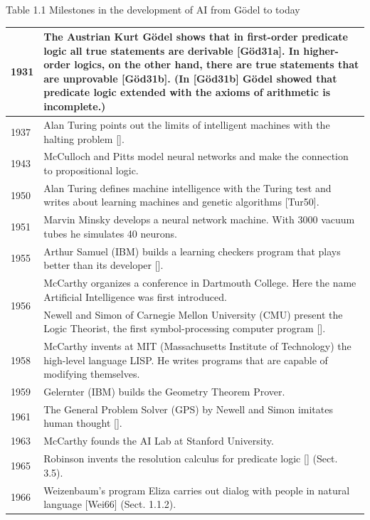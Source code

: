 \documentclass[10pt]{book}
\begin{document}
Table 1.1 Milestones in the development of AI from Gödel to today
\begin{center}
\begin{tabular}{|l|l|}
\hline
1931 & The Austrian Kurt Gödel shows that in first-order predicate logic all true statements are derivable [Göd31a]. In higher-order logics, on the other hand, there are true statements that are unprovable [Göd31b]. (In [Göd31b] Gödel showed that predicate logic extended with the axioms of arithmetic is incomplete.) \\
\hline
1937 & Alan Turing points out the limits of intelligent machines with the halting problem [\cite{tur37}]. \\
\hline
1943 & McCulloch and Pitts model neural networks and make the connection to propositional logic. \\
\hline
1950 & Alan Turing defines machine intelligence with the Turing test and writes about learning machines and genetic algorithms [Tur50]. \\
\hline
1951 & Marvin Minsky develops a neural network machine. With 3000 vacuum tubes he simulates 40 neurons. \\
\hline
1955 & Arthur Samuel (IBM) builds a learning checkers program that plays better than its developer [\cite{sam59}]. \\
\hline
\multirow[t]{2}{*}{1956} & McCarthy organizes a conference in Dartmouth College. Here the name Artificial Intelligence was first introduced. \\
 & Newell and Simon of Carnegie Mellon University (CMU) present the Logic Theorist, the first symbol-processing computer program [\cite{nss83}]. \\
\hline
1958 & McCarthy invents at MIT (Massachusetts Institute of Technology) the high-level language LISP. He writes programs that are capable of modifying themselves. \\
\hline
1959 & Gelernter (IBM) builds the Geometry Theorem Prover. \\
\hline
1961 & The General Problem Solver (GPS) by Newell and Simon imitates human thought [\cite{ns61}]. \\
\hline
1963 & McCarthy founds the AI Lab at Stanford University. \\
\hline
1965 & Robinson invents the resolution calculus for predicate logic [\cite{rob65}] (Sect. 3.5). \\
\hline
1966 & Weizenbaum's program Eliza carries out dialog with people in natural language [Wei66] (Sect. 1.1.2). \\

\end{tabular}
\end{center}
\end{document}
